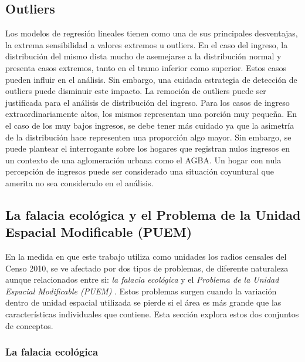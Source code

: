 	\subsection{Outliers}
	
Los modelos de regresión lineales tienen como una de sus principales desventajas, la extrema sensibilidad a valores extremos u outliers. En el caso del ingreso, la distribución del mismo dista mucho de asemejarse a la distribución normal y presenta casos extremos, tanto en el tramo inferior como superior. Estos casos pueden influir en el análisis. Sin embargo, una cuidada estrategia de detección de outliers puede disminuir este impacto. La remoción de outliers puede ser justificada para el análisis de distribución del ingreso. Para los casos de ingreso extraordinariamente altos, los mismos representan una porción muy pequeña. En el caso de los muy bajos ingresos, se debe tener más cuidado  ya que la asimetría de la distribución hace representen una proporción algo mayor. Sin embargo, se puede plantear el interrogante sobre los hogares que registran nulos ingresos en un contexto de una aglomeración urbana como el AGBA. Un hogar con nula percepción de ingresos puede ser considerado una situación coyuntural que amerita no sea considerado en el análisis.  


	\subsection{La falacia ecológica y el Problema   de   la   Unidad   Espacial   Modificable   (PUEM)}


En la medida en que este trabajo utiliza como unidades los radios censales del Censo 2010, se ve afectado por dos tipos de problemas, de diferente naturaleza aunque relacionados entre si: \textit{la falacia ecológica} y el \textit{Problema   de   la   Unidad   Espacial   Modificable   (PUEM)} {\cite{openshaw1977, openshaw1984}}. Estos problemas surgen cuando la variación dentro de unidad espacial utilizada se pierde si el área es más grande que las características individuales que contiene. Esta sección explora estos dos conjuntos de conceptos.
 
	\subsubsection{La falacia ecológica}

